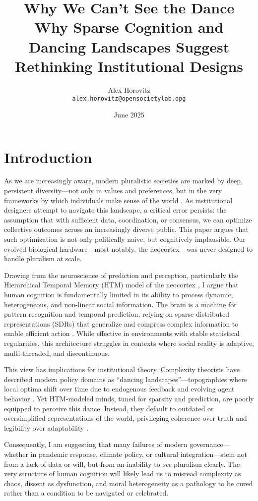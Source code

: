 \documentclass[12pt]{article}  %
\title{Why We Can’t See the Dance\\
\small Why Sparse Cognition and Dancing Landscapes Suggest Rethinking Institutional Designs}
\author{Alex Horovitz \\\small \texttt{alex.horovitz@opensocietylab.opg}}
\date{June 2025}
\begin{document}
\setlength{\parskip}{0.75em}
\maketitle

\section*{Introduction}

As we are increasingly aware, modern pluralistic societies are marked by deep, persistent diversity—not only in values and preferences, but in the very frameworks by which individuals make sense of the world \parencite{gaus2021open, muldoon2016social}. As institutional designers attempt to navigate this landscape, a critical error persists: the assumption that with sufficient data, coordination, or consensus, we can optimize collective outcomes across an increasingly diverse public. This paper argues that such optimization is not only politically naive, but cognitively implausible. Our evolved biological hardware—most notably, the neocortex—was never designed to handle pluralism at scale.

Drawing from the neuroscience of prediction and perception, particularly the Hierarchical Temporal Memory (HTM) model of the neocortex \parencite{hawkins2004intelligence, hawkins2021thousand}, I argue that human cognition is fundamentally limited in its ability to process dynamic, heterogeneous, and non-linear social information. The brain is a machine for pattern recognition and temporal prediction, relying on sparse distributed representations (SDRs) that generalize and compress complex information to enable efficient action \parencite{ahmad2016neurons}. While effective in environments with stable statistical regularities, this architecture struggles in contexts where social reality is adaptive, multi-threaded, and discontinuous.

This view has implications for institutional theory. Complexity theorists have described modern policy domains as “dancing landscapes”—topographies where local optima shift over time due to endogenous feedback and evolving agent behavior \parencite{kauffman1993origins, page2011diversity}. Yet HTM-modeled minds, tuned for sparsity and prediction, are poorly equipped to perceive this dance. Instead, they default to outdated or oversimplified representations of the world, privileging coherence over truth and legibility over adaptability \parencite{scott1998seeing}.

Consequently, I am suggesting that many failures of modern governance—whether in pandemic response, climate policy, or cultural integration—stem not from a lack of data or will, but from an inability to \textit{see} pluralism clearly. The very structure of human cognition will likely lead us to misread complexity as chaos, dissent as dysfunction, and moral heterogeneity as a pathology to be cured rather than a condition to be navigated or celebrated.
\end{document}

